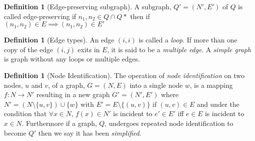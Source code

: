 \documentclass[a4paper,10pt]{article}
\theoremstyle{definition}
\newtheorem{definition}[theorem]{Definition}
\theoremstyle{definition}
\theoremstyle{remark}
\theoremstyle{definition}
\begin{document}
\begin{myfigure}
\begin{center}
\begin{submyfigure}{.3\textwidth}
\begin{center}
\end{center}
\caption{$Q_{1}$}
\label{subexamplefigure: induced subgraph}
\end{submyfigure}
\caption{ $Q_{1}$ is a subgraph of $Q$. However it is not induced as it is missing possible edges connecting nodes that existed in $Q$. $Q_{2}$ shows the induced subgraph on the chosen set of nodes. }
\end{center}
\label{examplefigure: subgraph example}
\end{myfigure}

\begin{definition}[Edge-preserving subgraph]
A subgraph, $Q'=(N',E')$ of $Q$ is called edge-preserving if $n_{1},n_{2} \in Q \cap Q*$ then if $(n_{1},n_{2}) \in E \implies (n_{1},n_{2}) \in E'$ 
\end{definition}

\begin{definition}[Edge types]
An edge $(i,i)$ is called a \textit{loop}. If more than one copy of the edge $(i,j)$ exits in $E$, it is said to be a \textit{multiple edge}. A \textit{simple graph} is graph without any loops or multiple edges.
\end{definition}

\begin{definition}[Node Identification]
The operation of \textit{node identification} on two nodes, $u$ and $v$, of a graph, $G=(N,E)$ into a single node $w$, is a mapping $f:N \rightarrow N'$ resulting in a new graph $G'=(N',E')$ where $N'=(N \setminus  \{u,v\}) \cup \{w\}$ with $E'=E \setminus \{(u,v)\}$ if $(u,v) \in E$ and under the condition that $\forall x \in N$, $f(x) \in N'$ is incident to $e' \in E'$ iff $e \in E$ is incident to $x \in N$.
Furthermore if a graph, $Q$, undergoes repeated node identification to become $Q'$ then we say it has been \textit{simplified}. 
\end{definition}
\end{document}
